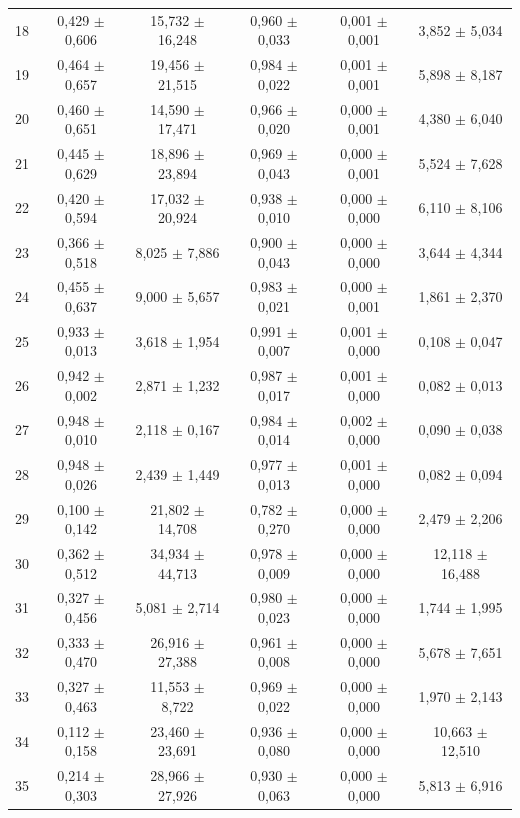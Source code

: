 \begin{tabular}{l c c c c c}
18 & 0,429 $\pm$ 0,606 & 15,732 $\pm$ 16,248 & 0,960 $\pm$ 0,033 & 0,001 $\pm$ 0,001 & 3,852 $\pm$ 5,034 \\
19 & 0,464 $\pm$ 0,657 & 19,456 $\pm$ 21,515 & 0,984 $\pm$ 0,022 & 0,001 $\pm$ 0,001 & 5,898 $\pm$ 8,187 \\
20 & 0,460 $\pm$ 0,651 & 14,590 $\pm$ 17,471 & 0,966 $\pm$ 0,020 & 0,000 $\pm$ 0,001 & 4,380 $\pm$ 6,040 \\
21 & 0,445 $\pm$ 0,629 & 18,896 $\pm$ 23,894 & 0,969 $\pm$ 0,043 & 0,000 $\pm$ 0,001 & 5,524 $\pm$ 7,628 \\
22 & 0,420 $\pm$ 0,594 & 17,032 $\pm$ 20,924 & 0,938 $\pm$ 0,010 & 0,000 $\pm$ 0,000 & 6,110 $\pm$ 8,106 \\
23 & 0,366 $\pm$ 0,518 & 8,025 $\pm$ 7,886 & 0,900 $\pm$ 0,043 & 0,000 $\pm$ 0,000 & 3,644 $\pm$ 4,344 \\
24 & 0,455 $\pm$ 0,637 & 9,000 $\pm$ 5,657 & 0,983 $\pm$ 0,021 & 0,000 $\pm$ 0,001 & 1,861 $\pm$ 2,370 \\
25 & 0,933 $\pm$ 0,013 & 3,618 $\pm$ 1,954 & 0,991 $\pm$ 0,007 & 0,001 $\pm$ 0,000 & 0,108 $\pm$ 0,047 \\
26 & 0,942 $\pm$ 0,002 & 2,871 $\pm$ 1,232 & 0,987 $\pm$ 0,017 & 0,001 $\pm$ 0,000 & 0,082 $\pm$ 0,013 \\
27 & 0,948 $\pm$ 0,010 & 2,118 $\pm$ 0,167 & 0,984 $\pm$ 0,014 & 0,002 $\pm$ 0,000 & 0,090 $\pm$ 0,038 \\
28 & 0,948 $\pm$ 0,026 & 2,439 $\pm$ 1,449 & 0,977 $\pm$ 0,013 & 0,001 $\pm$ 0,000 & 0,082 $\pm$ 0,094 \\
29 & 0,100 $\pm$ 0,142 & 21,802 $\pm$ 14,708 & 0,782 $\pm$ 0,270 & 0,000 $\pm$ 0,000 & 2,479 $\pm$ 2,206 \\
30 & 0,362 $\pm$ 0,512 & 34,934 $\pm$ 44,713 & 0,978 $\pm$ 0,009 & 0,000 $\pm$ 0,000 & 12,118 $\pm$ 16,488 \\
31 & 0,327 $\pm$ 0,456 & 5,081 $\pm$ 2,714 & 0,980 $\pm$ 0,023 & 0,000 $\pm$ 0,000 & 1,744 $\pm$ 1,995 \\
32 & 0,333 $\pm$ 0,470 & 26,916 $\pm$ 27,388 & 0,961 $\pm$ 0,008 & 0,000 $\pm$ 0,000 & 5,678 $\pm$ 7,651 \\
33 & 0,327 $\pm$ 0,463 & 11,553 $\pm$ 8,722 & 0,969 $\pm$ 0,022 & 0,000 $\pm$ 0,000 & 1,970 $\pm$ 2,143 \\
34 & 0,112 $\pm$ 0,158 & 23,460 $\pm$ 23,691 & 0,936 $\pm$ 0,080 & 0,000 $\pm$ 0,000 & 10,663 $\pm$ 12,510 \\
35 & 0,214 $\pm$ 0,303 & 28,966 $\pm$ 27,926 & 0,930 $\pm$ 0,063 & 0,000 $\pm$ 0,000 & 5,813 $\pm$ 6,916 \\

\end{tabular}
